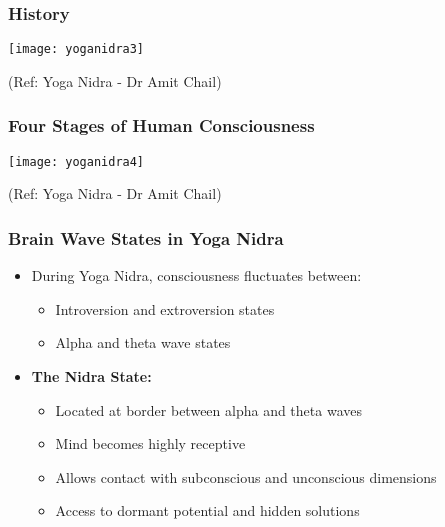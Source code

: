 \begin{frame}[fragile]\frametitle{History}
      \begin{center}
        \texttt{[image: yoganidra3]}

		{\tiny (Ref: Yoga Nidra - Dr Amit Chail)}		
        \end{center}

\end{frame}

\begin{frame}[fragile]\frametitle{Four Stages of Human Consciousness}
      \begin{center}
        \texttt{[image: yoganidra4]}

		{\tiny (Ref: Yoga Nidra - Dr Amit Chail)}		
        \end{center}

\end{frame}

\begin{frame}[fragile]\frametitle{Brain Wave States in Yoga Nidra}
    \begin{itemize}
        \item During Yoga Nidra, consciousness fluctuates between:
        \begin{itemize}
            \item Introversion and extroversion states
            \item Alpha and theta wave states
        \end{itemize}
        \item \textbf{The Nidra State:}
        \begin{itemize}
            \item Located at border between alpha and theta waves
            \item Mind becomes highly receptive
            \item Allows contact with subconscious and unconscious dimensions
            \item Access to dormant potential and hidden solutions
        \end{itemize}
    \end{itemize}
\end{frame}


